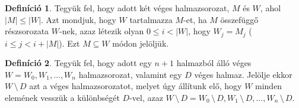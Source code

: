 \documentclass[12pt]{article}
\theoremstyle{definition}
\newtheorem{definition}{Definíció}
\theoremstyle{remark}
\theoremstyle{plain}
\theoremstyle{remark}
\theoremstyle{plain}
\begin{document}
    \begin{definition}
        Tegyük fel, hogy adott két véges halmazsorozat, $M$ és $W$, ahol $|M| \leq |W|$. Azt mondjuk, hogy $W$ tartalmazza $M$-et, ha $M$ összefüggő részsorozata $W$-nek, azaz létezik olyan $0 \leq i < |W|$, hogy $W_{j} = M_{j}$ ($i \leq j < i + |M|$). Ezt $M \subseteq W$ módon jelöljük.
    \end{definition}

    \begin{definition}
        Tegyük fel, hogy adott egy $n + 1$ halmazból álló véges $W=W_{0}, W_{1}, \ldots, W_{n}$ halmazsorozat, valamint egy $D$ véges halmaz. Jelölje ekkor $W \,\setminus\, D$ azt a véges halmazsorozatot, melyet úgy állítunk elő, hogy $W$ minden elemének vesszük a különbségét $D$-vel, azaz $W \,\setminus\, D = W_{0} \,\setminus\, D, W_{1} \,\setminus\, D, \ldots, W_{n} \,\setminus\, D$.
    \end{definition}
\end{document}
